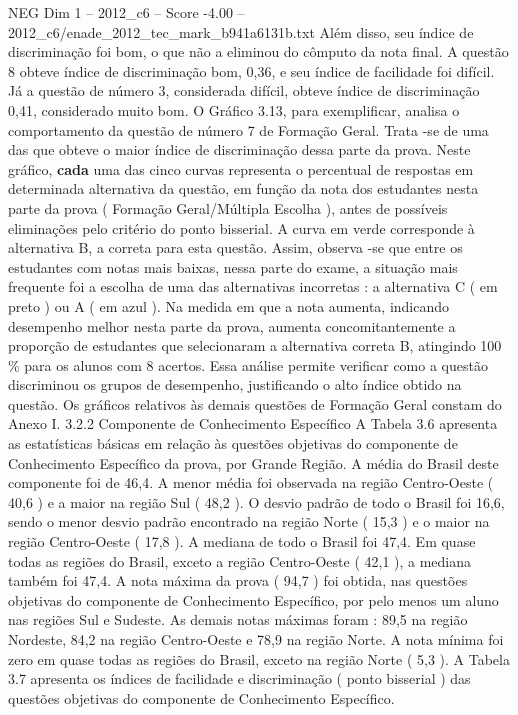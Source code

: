 \begin{textsample}{NEG Dim 1 – 2012\_c6 – Score -4.00 – 2012\_c6/enade\_2012\_tec\_mark\_b941a6131b.txt}
Além disso, seu índice de discriminação foi bom, o que não a eliminou do cômputo da nota final.
A questão 8 obteve índice de discriminação bom, 0,36, e seu índice de facilidade foi difícil.
Já a questão de número 3, considerada difícil, obteve índice de discriminação 0,41, considerado muito bom.
O Gráfico 3.13, para exemplificar, analisa o comportamento da questão de número 7 de Formação Geral.
Trata -se de uma das que obteve o maior índice de discriminação dessa parte da prova.
Neste gráfico, \textbf{cada} uma das cinco curvas representa o percentual de respostas em determinada alternativa da questão, em função da nota dos estudantes nesta parte da prova ( Formação Geral/Múltipla Escolha ), antes de possíveis eliminações pelo critério do ponto bisserial.
A curva em verde corresponde à alternativa B, a correta para esta questão.
Assim, observa -se que entre os estudantes com notas mais baixas, nessa parte do exame, a situação mais frequente foi a escolha de uma das alternativas incorretas : a alternativa C ( em preto ) ou A ( em azul ).
Na medida em que a nota aumenta, indicando desempenho melhor nesta parte da prova, aumenta concomitantemente a proporção de estudantes que selecionaram a alternativa correta B, atingindo 100 \% para os alunos com 8 acertos.
Essa análise permite verificar como a questão discriminou os grupos de desempenho, justificando o alto índice obtido na questão.
Os gráficos relativos às demais questões de Formação Geral constam do Anexo I. 3.2.2 Componente de Conhecimento Específico A Tabela 3.6 apresenta as estatísticas básicas em relação às questões objetivas do componente de Conhecimento Específico da prova, por Grande Região.
A média do Brasil deste componente foi de 46,4.
A menor média foi observada na região Centro-Oeste ( 40,6 ) e a maior na região Sul ( 48,2 ).
O desvio padrão de todo o Brasil foi 16,6, sendo o menor desvio padrão encontrado na região Norte ( 15,3 ) e o maior na região Centro-Oeste ( 17,8 ).
A mediana de todo o Brasil foi 47,4.
Em quase todas as regiões do Brasil, exceto a região Centro-Oeste ( 42,1 ), a mediana também foi 47,4.
A nota máxima da prova ( 94,7 ) foi obtida, nas questões objetivas do componente de Conhecimento Específico, por pelo menos um aluno nas regiões Sul e Sudeste.
As demais notas máximas foram : 89,5 na região Nordeste, 84,2 na região Centro-Oeste e 78,9 na região Norte.
A nota mínima foi zero em quase todas as regiões do Brasil, exceto na região Norte ( 5,3 ).
A Tabela 3.7 apresenta os índices de facilidade e discriminação ( ponto bisserial ) das questões objetivas do componente de Conhecimento Específico.

\end{textsample}
